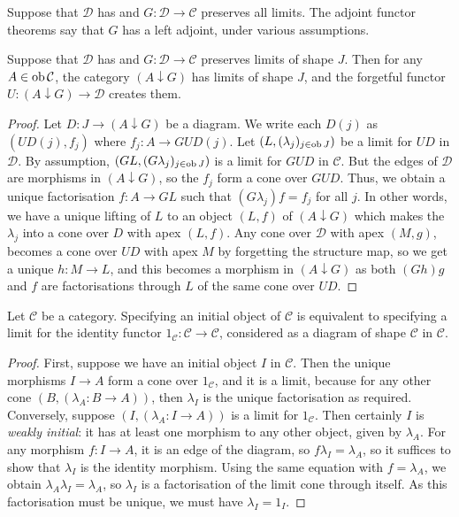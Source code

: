 Suppose that \( \mathcal D \) has and \( G : \mathcal D \to \mathcal C \) preserves all limits.
The adjoint functor theorems say that \( G \) has a left adjoint, under various assumptions.
\begin{lemma}
    Suppose that \( \mathcal D \) has and \( G : \mathcal D \to \mathcal C \) preserves limits of shape \( J \).
    Then for any \( A \in \operatorname{ob} \mathcal C \), the category \( (A \downarrow G) \) has limits of shape \( J \), and the forgetful functor \( U : (A \downarrow G) \to \mathcal D \) creates them.
\end{lemma}
\begin{proof}
    Let \( D : J \to (A \downarrow G) \) be a diagram.
    We write each \( D(j) \) as \( (UD(j), f_j) \) where \( f_j : A \to GUD(j) \).
    Let \( (L, (\lambda_j)_{j \in \operatorname{ob} J}) \) be a limit for \( UD \) in \( \mathcal D \).
    By assumption, \( (GL, (G\lambda_j)_{j \in \operatorname{ob} J}) \) is a limit for \( GUD \) in \( \mathcal C \).
    But the edges of \( \mathcal D \) are morphisms in \( (A \downarrow G) \), so the \( f_j \) form a cone over \( GUD \).
    Thus, we obtain a unique factorisation \( f : A \to GL \) such that \( (G\lambda_j) f = f_j \) for all \( j \).
    In other words, we have a unique lifting of \( L \) to an object \( (L, f) \) of \( (A \downarrow G) \) which makes the \( \lambda_j \) into a cone over \( D \) with apex \( (L, f) \).
    Any cone over \( \mathcal D \) with apex \( (M, g) \), becomes a cone over \( UD \) with apex \( M \) by forgetting the structure map, so we get a unique \( h : M \to L \), and this becomes a morphism in \( (A \downarrow G) \) as both \( (Gh)g \) and \( f \) are factorisations through \( L \) of the same cone over \( UD \). 
\end{proof}
\begin{lemma}
    Let \( \mathcal C \) be a category.
    Specifying an initial object of \( \mathcal C \) is equivalent to specifying a limit for the identity functor \( 1_{\mathcal C} : \mathcal C \to \mathcal C \), considered as a diagram of shape \( \mathcal C \) in \( \mathcal C \).
\end{lemma}
\begin{proof}
    First, suppose we have an initial object \( I \) in \( \mathcal C \).
    Then the unique morphisms \( I \to A \) form a cone over \( 1_{\mathcal C} \), and it is a limit, because for any other cone \( (B, (\lambda_A : B \to A)) \), then \( \lambda_I \) is the unique factorisation as required.
    Conversely, suppose \( (I, (\lambda_A : I \to A)) \) is a limit for \( 1_{\mathcal C} \).
    Then certainly \( I \) is \emph{weakly initial}: it has at least one morphism to any other object, given by \( \lambda_A \).
    For any morphism \( f : I \to A \), it is an edge of the diagram, so \( f \lambda_I = \lambda_A \), so it suffices to show that \( \lambda_I \) is the identity morphism.
    Using the same equation with \( f = \lambda_A \), we obtain \( \lambda_A \lambda_I = \lambda_A \), so \( \lambda_I \) is a factorisation of the limit cone through itself.
    As this factorisation must be unique, we must have \( \lambda_I = 1_I \).
\end{proof}
